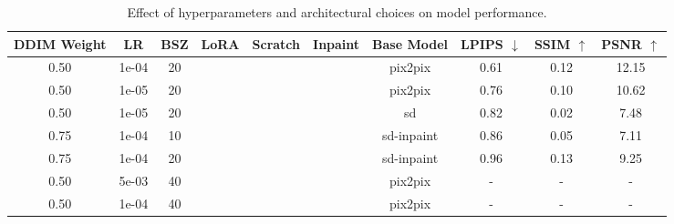 \documentclass[11pt,twocolumn]{article}
\newcommand{\cmark}{\checkmark}
\newcommand{\xmark}{\ding{55}}
\begin{document}
\begin{table*}[t]
  \begin{subtable}[t]{\textwidth}
    \centering
    \vspace{0pt}
    \begin{tabular}{ccccccc|ccc}
    \toprule
    \textbf{DDIM Weight} & \textbf{LR} & \textbf{BSZ} & \textbf{LoRA} & \textbf{Scratch} & \textbf{Inpaint} & \textbf{Base Model} & \textbf{LPIPS} $\downarrow$ & \textbf{SSIM} $\uparrow$ & \textbf{PSNR} $\uparrow$ \\
    \midrule
    0.50 & 1e-04 & 20 & \cmark & \xmark & \xmark & pix2pix & 0.61 & 0.12 & 12.15 \\
    0.50 & 1e-05 & 20 & \cmark & \xmark & \xmark & pix2pix & 0.76 & 0.10 & 10.62 \\
    0.50 & 1e-05 & 20 & \xmark & \cmark & \xmark & sd & 0.82 & 0.02 & 7.48 \\
    0.75 & 1e-04 & 10 & \xmark & \xmark & \cmark & sd-inpaint & 0.86 & 0.05 & 7.11 \\
    0.75 & 1e-04 & 20 & \cmark & \xmark & \cmark & sd-inpaint & 0.96 & 0.13 & 9.25 \\
    0.50 & 5e-03 & 40 & \cmark & \xmark & \xmark & pix2pix & - & - & - \\
    0.50 & 1e-04 & 40 & \cmark & \xmark & \xmark & pix2pix & - & - & - \\
    \bottomrule
    \end{tabular}
    \label{tab:arch-ablation}
  \end{subtable}

  \caption{Effect of hyperparameters and architectural choices on model performance.}
  \label{tab:combined-hparams-arch}
\end{table*}




\newpage


\end{document}
